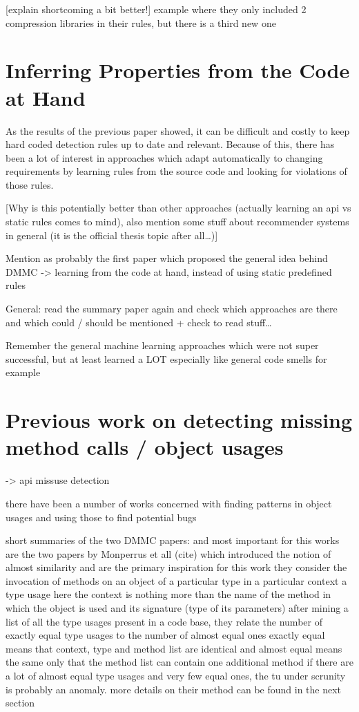 [explain shortcoming a bit better!]
example where they only included 2 compression libraries in their rules, but there is a third new one

\section{Inferring Properties from the Code at Hand}

As the results of the previous paper showed, it can be difficult and costly to keep hard coded detection rules up to date and relevant.
Because of this, there has been a lot of interest in approaches which adapt automatically to changing requirements by learning rules from the source code and looking for violations of those rules.

[Why is this potentially better than other approaches (actually learning an api vs static rules comes to mind),
also mention some stuff about recommender systems in general (it is the official thesis topic after all\ldots)]

Mention \cite{engler2001bugs} as probably the first paper which proposed the general idea behind DMMC -> learning from the code at hand, instead of using static predefined rules

General: read the summary paper \cite{robillard2013automated} again and check which approaches are there and which could / should be mentioned
+ check to read stuff\ldots

Remember the general machine learning approaches which were not super successful, but at least learned a LOT
especially like general code smells for example

\section{Previous work on detecting missing method calls / object usages}
-> api missuse detection

there have been a number of works concerned with finding patterns in object usages and using those to find potential bugs

short summaries of the two DMMC papers: \cite{monperrus2010detecting} and \cite{monperrus2013detecting}
most important for this works are the two papers by Monperrus et all (cite)
which introduced the notion of almost similarity and are the primary inspiration for this work
they consider the invocation of methods on an object of a particular type in a particular context a type usage
here the context is nothing more than the name of the method in which the object is used and its signature (type of its parameters)
after mining a list of all the type usages present in a code base, they relate the number of exactly equal type usages to the number of almost equal ones
exactly equal means that context, type and method list are identical and almost equal means the same only that the method list can contain one additional method
if there are a lot of almost equal type usages and very few equal ones, the tu under scrunity is probably an anomaly.
more details on their method can be found in the next section

